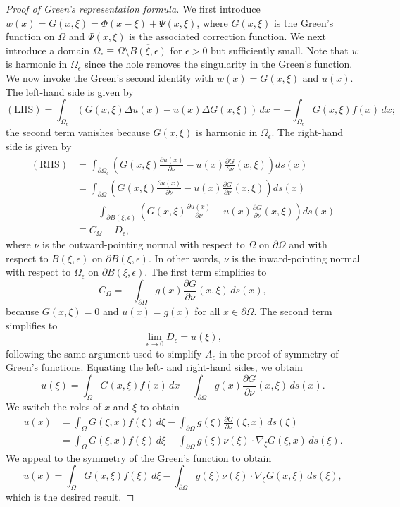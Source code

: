 \begin{proof}[Proof of Green's representation formula]
    We first introduce $w(x) = G(x, \xi) = \Phi(x - \xi) + \Psi(x, \xi)$, where $G(x, \xi)$ is the Green's function on $\Omega$ and $\Psi(x, \xi)$ is the associated correction function. We next introduce a domain $\Omega_\epsilon \equiv \Omega \setminus \overline{B(\xi, \epsilon)}$ for $\epsilon > 0$ but sufficiently small. Note that $w$ is harmonic in $\Omega_\epsilon$ since the hole removes the singularity in the Green's function. We now invoke the Green's second identity with $w(x) = G(x, \xi)$ and $u(x)$. The left-hand side is given by
    \[(\text{LHS}) = \int_{\Omega_\epsilon} (G(x, \xi)\Delta u(x) - u(x)\Delta G(x, \xi))\,dx = -\int_{\Omega_\epsilon} G(x, \xi)f(x)\,dx;\]
    the second term vanishes because $G(x, \xi)$ is harmonic in $\Omega_\epsilon$. The right-hand side is given by
    \begin{align*}
        (\text{RHS}) &= \int_{\partial\Omega_\epsilon} \left(G(x, \xi)\frac{\partial u(x)}{\partial\nu} - u(x)\frac{\partial G}{\partial\nu}(x, \xi)\right) ds(x) \\
        &= \int_{\partial\Omega} \left(G(x, \xi)\frac{\partial u(x)}{\partial\nu} - u(x)\frac{\partial G}{\partial\nu}(x, \xi)\right) ds(x) \\
        &\quad - \int_{\partial B(\xi, \epsilon)} \left(G(x, \xi)\frac{\partial u(x)}{\partial\nu} - u(x)\frac{\partial G}{\partial\nu}(x, \xi)\right) ds(x) \\
        &\equiv C_\Omega - D_\epsilon,
    \end{align*}
    where $\nu$ is the outward-pointing normal with respect to $\Omega$ on $\partial\Omega$ and with respect to $B(\xi, \epsilon)$ on $\partial B(\xi, \epsilon)$. In other words, $\nu$ is the inward-pointing normal with respect to $\Omega_\epsilon$ on $\partial B(\xi, \epsilon)$. The first term simplifies to
    \[C_\Omega = -\int_{\partial\Omega} g(x)\frac{\partial G}{\partial\nu}(x, \xi)\,ds(x),\]
    because $G(x, \xi) = 0$ and $u(x) = g(x)$ for all $x \in \partial\Omega$. The second term simplifies to
    \[\lim_{\epsilon \to 0} D_\epsilon = u(\xi),\]
    following the same argument used to simplify $A_\epsilon$ in the proof of symmetry of Green's functions. Equating the left- and right-hand sides, we obtain
    \[u(\xi) = \int_\Omega G(x, \xi)f(x)\,dx - \int_{\partial\Omega} g(x)\frac{\partial G}{\partial\nu}(x, \xi)\,ds(x).\]
    We switch the roles of $x$ and $\xi$ to obtain
    \begin{align*}
        u(x) &= \int_\Omega G(\xi, x)f(\xi)\,d\xi - \int_{\partial\Omega} g(\xi)\frac{\partial G}{\partial\nu}(\xi, x)\,ds(\xi) \\
        &= \int_\Omega G(\xi, x)f(\xi)\,d\xi - \int_{\partial\Omega} g(\xi)\nu(\xi) \cdot \nabla_\xi G(\xi, x)\,ds(\xi).
    \end{align*}
    We appeal to the symmetry of the Green's function to obtain
    \[u(x) = \int_\Omega G(x, \xi)f(\xi)\,d\xi - \int_{\partial\Omega} g(\xi)\nu(\xi) \cdot \nabla_\xi G(x, \xi)\,ds(\xi),\]
    which is the desired result.
\end{proof}

